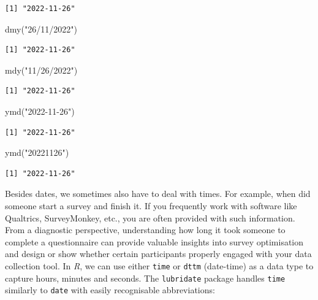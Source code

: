 \documentclass[
  letterpaper,
  DIV=11,
  numbers=noendperiod]{scrreprt}
\newenvironment{Shaded}{\begin{snugshade}}{\end{snugshade}}
\newcommand{\FunctionTok}[1]{\textcolor[rgb]{0.28,0.35,0.67}{#1}}
\newcommand{\NormalTok}[1]{\textcolor[rgb]{0.00,0.23,0.31}{#1}}
\newcommand{\StringTok}[1]{\textcolor[rgb]{0.13,0.47,0.30}{#1}}
\begin{document}
\begin{verbatim}
[1] "2022-11-26"
\end{verbatim}

\begin{Shaded}
\begin{Highlighting}[]
\FunctionTok{dmy}\NormalTok{(}\StringTok{"26/11/2022"}\NormalTok{)}
\end{Highlighting}
\end{Shaded}

\begin{verbatim}
[1] "2022-11-26"
\end{verbatim}

\begin{Shaded}
\begin{Highlighting}[]
\FunctionTok{mdy}\NormalTok{(}\StringTok{"11/26/2022"}\NormalTok{)}
\end{Highlighting}
\end{Shaded}

\begin{verbatim}
[1] "2022-11-26"
\end{verbatim}

\begin{Shaded}
\begin{Highlighting}[]
\FunctionTok{ymd}\NormalTok{(}\StringTok{"2022{-}11{-}26"}\NormalTok{)}
\end{Highlighting}
\end{Shaded}

\begin{verbatim}
[1] "2022-11-26"
\end{verbatim}

\begin{Shaded}
\begin{Highlighting}[]
\FunctionTok{ymd}\NormalTok{(}\StringTok{"20221126"}\NormalTok{)}
\end{Highlighting}
\end{Shaded}

\begin{verbatim}
[1] "2022-11-26"
\end{verbatim}

Besides dates, we sometimes also have to deal with times. For example,
when did someone start a survey and finish it. If you frequently work
with software like Qualtrics, SurveyMonkey, etc., you are often provided
with such information. From a diagnostic perspective, understanding how
long it took someone to complete a questionnaire can provide valuable
insights into survey optimisation and design or show whether certain
participants properly engaged with your data collection tool. In
\emph{R}, we can use either \texttt{time} or \texttt{dttm} (date-time)
as a data type to capture hours, minutes and seconds. The
\texttt{lubridate} package handles \texttt{time} similarly to
\texttt{date} with easily recognisable abbreviations:
\end{document}
